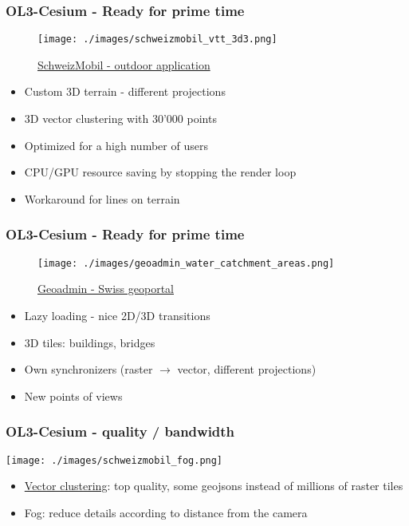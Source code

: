 \documentclass[presentation]{beamer}
\begin{document}
  \begin{frame}
    \frametitle{OL3-Cesium - Ready for prime time}
    \begin{figure}
    \begin{center}
      \texttt{[image: ./images/schweizmobil\_vtt\_3d3.png]}
    \end{center}
    \href {https://map.schweizmobil.ch/?cesium&trackId=2149217&lang=fr&bgLayer=lb&resolution=10.86&X=561417&Y=141893&layers=Bus\%2CWanderland}{SchweizMobil - outdoor application}
    \end{figure}

    \begin{itemize}
      \pause\item Custom 3D terrain - different projections
      \pause\item 3D vector clustering with 30'000 points
      \pause\item Optimized for a high number of users
      \pause\item CPU/GPU resource saving by stopping the render loop
      \pause\item Workaround for lines on terrain
     \end{itemize}
  \end{frame}

  \begin{frame}
    \frametitle{OL3-Cesium - Ready for prime time}
    \begin{figure}
    \begin{center}
      \texttt{[image: ./images/geoadmin\_water\_catchment\_areas.png]}
    \end{center}
    \href {https://map.geo.admin.ch}{Geoadmin - Swiss geoportal}
    \end{figure}

    \begin{itemize}
      \pause\item Lazy loading - nice 2D/3D transitions
      \pause\item 3D tiles: buildings, bridges
      \pause\item Own synchronizers (raster $\rightarrow$ vector, different projections)
      \pause\item New points of views
    \end{itemize}
  \end{frame}


  \begin{frame}
    \frametitle{OL3-Cesium - quality / bandwidth}
    \begin{center}
      \texttt{[image: ./images/schweizmobil\_fog.png]}
    \end{center}

    \begin{itemize}
     \pause\item \href {https://github.com/gberaudo/ol3-cluster-tool}{Vector clustering}: top quality, some geojsons instead of millions of raster tiles
     \pause\item Fog: reduce details according to distance from the camera
    \end{itemize}
  \end{frame}
\end{document}
